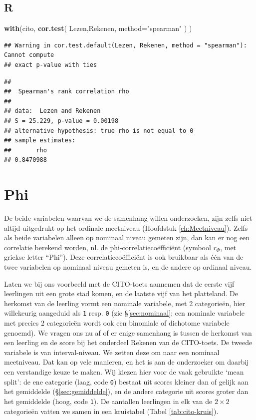 \documentclass[
]{book}
\newenvironment{Shaded}{\begin{snugshade}}{\end{snugshade}}
\newcommand{\DataTypeTok}[1]{\textcolor[rgb]{0.13,0.29,0.53}{#1}}
\newcommand{\KeywordTok}[1]{\textcolor[rgb]{0.13,0.29,0.53}{\textbf{#1}}}
\newcommand{\NormalTok}[1]{#1}
\newcommand{\StringTok}[1]{\textcolor[rgb]{0.31,0.60,0.02}{#1}}
\begin{document}
\hypertarget{r-9}{%
\subsection{R}\label{r-9}}

\begin{Shaded}
\begin{Highlighting}[]
\KeywordTok{with}\NormalTok{(cito, }\KeywordTok{cor.test}\NormalTok{( Lezen,Rekenen, }\DataTypeTok{method=}\StringTok{"spearman"}\NormalTok{ ) )}
\end{Highlighting}
\end{Shaded}

\begin{verbatim}
## Warning in cor.test.default(Lezen, Rekenen, method = "spearman"): Cannot compute
## exact p-value with ties
\end{verbatim}

\begin{verbatim}
## 
##  Spearman's rank correlation rho
## 
## data:  Lezen and Rekenen
## S = 25.229, p-value = 0.00198
## alternative hypothesis: true rho is not equal to 0
## sample estimates:
##       rho 
## 0.8470988
\end{verbatim}

\hypertarget{sec:Phi}{%
\section{Phi}\label{sec:Phi}}

De beide variabelen waarvan we de samenhang willen onderzoeken, zijn
zelfs niet altijd uitgedrukt op het ordinale meetniveau
(Hoofdstuk \ref{ch:Meetniveau}). Zelfs als beide variabelen alleen op
nominaal niveau gemeten zijn, dan kan er nog een correlatie berekend
worden, nl. de phi-correlatiecoëfficiënt (symbool \(r_\Phi\), met griekse
letter ``Phi''). Deze correlatiecoëfficiënt is ook bruikbaar als één van
de twee variabelen op nominaal niveau gemeten is, en de andere op
ordinaal niveau.

Laten we bij ons voorbeeld met de CITO-toets aannemen dat de eerste vijf
leerlingen uit een grote stad komen, en de laatste vijf van het
platteland. De herkomst van de leerling vormt een nominale variabele,
met 2 categorieën, hier willekeurig aangeduid als \texttt{1} resp. \texttt{0} (zie
§\ref{sec:nominaal}; een nominale variabele met precies 2
categorieën wordt ook een binomiale of dichotome variabele genoemd). We
vragen ons nu af of er enige samenhang is tussen de herkomst van een
leerling en de score bij het onderdeel Rekenen van de CITO-toets. De
tweede variabele is van interval-niveau. We zetten deze om naar een
nominaal meetniveau. Dat kan op vele manieren, en het is aan de
onderzoeker om daarbij een verstandige keuze te maken. Wij kiezen hier
voor de vaak gebruikte `mean split': de ene categorie (laag, code \texttt{0})
bestaat uit scores kleiner dan of gelijk aan het gemiddelde
(§\ref{sec:gemiddelde}), en de andere categorie uit scores groter
dan het gemiddelde (hoog, code \texttt{1}). De aantallen leerlingen in elk van
de \(2\times 2\) categorieën vatten we samen in een kruistabel
(Tabel \ref{tab:cito-kruis}).
\end{document}
